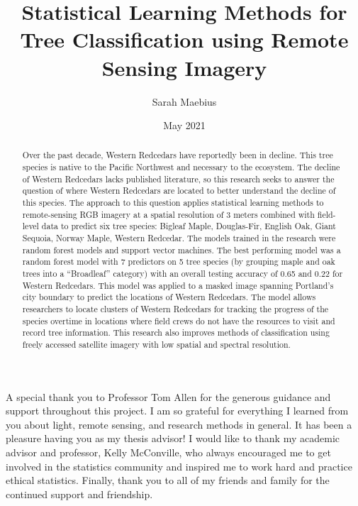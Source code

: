 \documentclass[12pt,twoside]{reedthesis}
\title{Statistical Learning Methods for Tree Classification using Remote Sensing Imagery}
\author{Sarah Maebius}
\date{May 2021}
\begin{document}
  \maketitle

\frontmatter %
\pagestyle{empty} %
  \begin{acknowledgements}
    A special thank you to Professor Tom Allen for the generous guidance and support throughout this project. I am so grateful for everything I learned from you about light, remote sensing, and research methods in general. It has been a pleasure having you as my thesis advisor! I would like to thank my academic advisor and professor, Kelly McConville, who always encouraged me to get involved in the statistics community and inspired me to work hard and practice ethical statistics. Finally, thank you to all of my friends and family for the continued support and friendship.
  \end{acknowledgements}

  \hypersetup{linkcolor=black}
  \setcounter{tocdepth}{2}
  \tableofcontents

  \listoftables

  \listoffigures
  \begin{abstract}
    Over the past decade, Western Redcedars have reportedly been in decline. This tree species is native to the Pacific Northwest and necessary to the ecosystem. The decline of Western Redcedars lacks published literature, so this research seeks to answer the question of where Western Redcedars are located to better understand the decline of this species. The approach to this question applies statistical learning methods to remote-sensing RGB imagery at a spatial resolution of 3 meters combined with field-level data to predict six tree species: Bigleaf Maple, Douglas-Fir, English Oak, Giant Sequoia, Norway Maple, Western Redcedar. The models trained in the research were random forest models and support vector machines. The best performing model was a random forest model with 7 predictors on 5 tree species (by grouping maple and oak trees into a ``Broadleaf'' category) with an overall testing accuracy of 0.65 and 0.22 for Western Redcedars. This model was applied to a masked image spanning Portland's city boundary to predict the locations of Western Redcedars. The model allows researchers to locate clusters of Western Redcedars for tracking the progress of the species overtime in locations where field crews do not have the resources to visit and record tree information. This research also improves methods of classification using freely accessed satellite imagery with low spatial and spectral resolution.
  \end{abstract}
\end{document}
